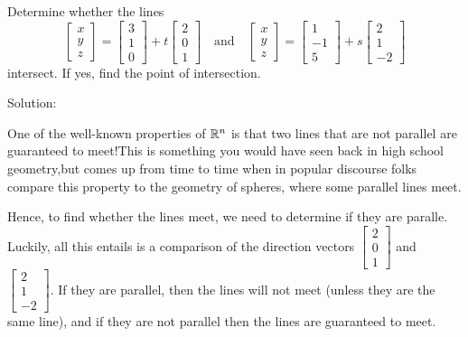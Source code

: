 \documentclass{ximera}
\begin{document}
\begin{example}\label{ex:lines-intersect}

  Determine whether the lines
  \begin{equation*}
    \begin{bmatrix} x \\ y \\ z \end{bmatrix}
    = \begin{bmatrix} 3 \\ 1 \\ 0 \end{bmatrix}
    + t \begin{bmatrix} 2 \\ 0 \\ 1 \end{bmatrix}
    \quad\mbox{and}\quad
    \begin{bmatrix} x \\ y \\ z \end{bmatrix}
    = \begin{bmatrix} 1 \\ -1 \\ 5 \end{bmatrix}
    + s \begin{bmatrix} 2 \\ 1 \\ -2 \end{bmatrix}
  \end{equation*}
  intersect. If yes, find the point of intersection.%

  Solution:

  One of the well-known properties of $\mathbb{R}^n$ is that two lines that are not parallel are guaranteed to meet!This is something you would have seen back in high school geometry,but comes up from time to time when in popular discourse folks compare this property to the geometry of spheres, where some parallel lines meet.

  Hence, to find whether the lines meet, we need to determine if they are paralle. Luckily, all this entails is a comparison of the direction vectors $\begin{bmatrix} 2 \\ 0 \\ 1 \end{bmatrix}$ and $\begin{bmatrix} 2 \\ 1 \\ -2 \end{bmatrix}$. If they are parallel, then the lines will not meet (unless they are the same line), and if they are not parallel then the lines are guaranteed to meet.


\end{example}
\end{document}
